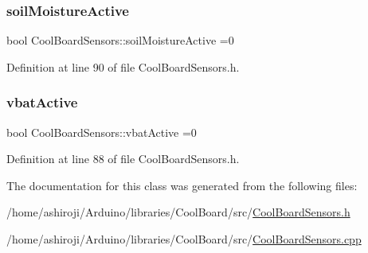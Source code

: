 \subsubsection{\texorpdfstring{soil\+Moisture\+Active}{soilMoistureActive}}
{\footnotesize\ttfamily bool Cool\+Board\+Sensors\+::soil\+Moisture\+Active =0\hspace{0.3cm}{\ttfamily [private]}}



Definition at line 90 of file Cool\+Board\+Sensors.\+h.

\mbox{\label{class_cool_board_sensors_ab0b4bbae83796b52b90f91008d383583}} 
\subsubsection{\texorpdfstring{vbat\+Active}{vbatActive}}
{\footnotesize\ttfamily bool Cool\+Board\+Sensors\+::vbat\+Active =0\hspace{0.3cm}{\ttfamily [private]}}



Definition at line 88 of file Cool\+Board\+Sensors.\+h.



The documentation for this class was generated from the following files\+:\begin{DoxyCompactItemize}
\item 
/home/ashiroji/\+Arduino/libraries/\+Cool\+Board/src/\hyperlink{_cool_board_sensors_8h}{Cool\+Board\+Sensors.\+h}\item 
/home/ashiroji/\+Arduino/libraries/\+Cool\+Board/src/\hyperlink{_cool_board_sensors_8cpp}{Cool\+Board\+Sensors.\+cpp}\end{DoxyCompactItemize}
